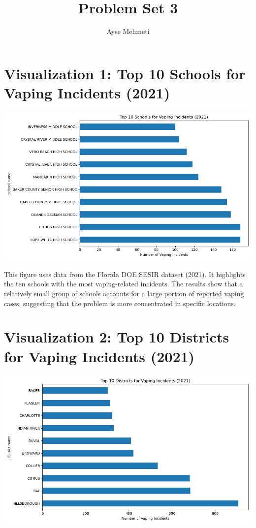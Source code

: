 \documentclass{article}
\title{Problem Set 3}
\author{Ayse Mehmeti}
\begin{document}
\maketitle

\section*{Visualization 1: Top 10 Schools for Vaping Incidents (2021)}
\includegraphics[width=\linewidth]{top_schools_vaping.png}
\vspace{0.5cm}

This figure uses data from the Florida DOE SESIR dataset (2021). 
It highlights the ten schools with the most vaping-related incidents. 
The results show that a relatively small group of schools accounts for 
a large portion of reported vaping cases, suggesting that the problem 
is more concentrated in specific locations.

\section*{Visualization 2: Top 10 Districts for Vaping Incidents (2021)}
\includegraphics[width=\linewidth]{top_districts_vaping.png}
\vspace{0.5cm}
\end{document}
